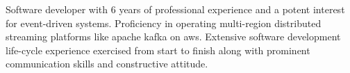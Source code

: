 \begin{cvletter}


Software developer with 6 years of professional experience and a potent interest for event-driven systems. Proficiency in operating multi-region distributed streaming platforms like apache kafka on aws. Extensive software development life-cycle experience exercised from start to finish along with prominent communication skills and constructive attitude. %


\end{cvletter}